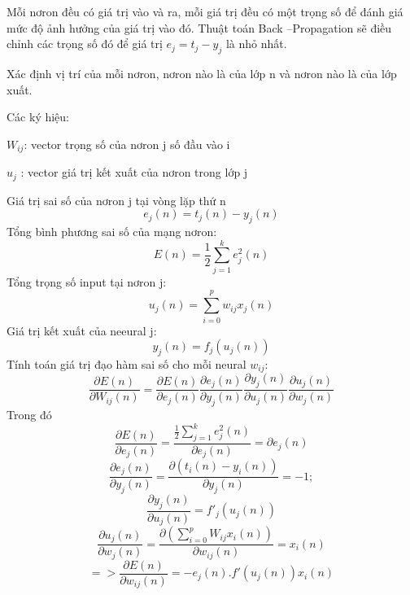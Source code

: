 Mỗi nơron đều có giá trị vào và ra, mỗi giá trị đều có một trọng số để đánh giá mức độ ảnh hưởng của giá trị vào đó. Thuật toán Back –Propagation sẽ điều chỉnh các trọng số đó để giá trị $ e_j = t_j - y_j $ là nhỏ nhất.

Xác định vị trí của mỗi nơron, nơron nào là của lớp n và nơron nào là của lớp xuất.

Các ký hiệu:

\qquad $W_{ij} $: vector trọng số của nơron j số đầu vào i

\qquad $u_j$ : vector giá trị kết xuất của nơron trong lớp j

Giá trị sai số của nơron j tại vòng lặp thứ n\\
\begin{equation}
e_j(n) = t_j(n) - y_j(n)
\end{equation}
Tổng bình phương sai số của mạng nơron:\\
\begin{equation}
E(n) = \frac{1}{2}\sum_{j= 1}^k e_j^2 (n)
\end{equation}
Tổng trọng số input tại nơron j:\\
\begin{equation}
u_j(n) = \sum_{i = 0}^pw_{ij}x_j(n)
\end{equation}
Giá trị kết xuất của neeural j:\\
\begin{equation}
y_j(n) = f_j(u_j(n))
\end{equation}
Tính toán giá trị đạo hàm sai số cho mỗi neural $w_{ij}$:
\begin{equation}
\frac{\partial E(n)}{\partial W_{ij}(n)} = \frac{\partial E(n)}{\partial e_j(n)}\frac{\partial e_j(n)}{\partial y_j(n)}\frac{\partial y_j(n)}{\partial u_j(n)}\frac{\partial u_j(n)}{\partial w_j(n)}
\end{equation}
Trong đó 
\begin{equation} 
\frac{\partial E(n)}{\partial e_j(n)}=\frac{\frac{1}{2} \sum_{j=1}^k e_j^2(n) }{\partial e_j(n)} = \partial e_j(n)
\end{equation}
\begin{equation} 
\frac{\partial e_j(n)}{\partial y_j(n)}=\frac{\partial(t_i(n) - y_i(n))}{\partial y_j(n)} = -1;
\end{equation}
\begin{equation} 
\frac{\partial y_j(n)}{\partial u_j(n)}=f'_j(u_j(n))
\end{equation}
\begin{equation} 
\frac{\partial u_j(n)}{\partial w_j(n)}=\frac{\partial (\sum_{i = 0}^p W_{ij} x_i(n))}{\partial w_{ij}(n)}= x_i(n)
\end{equation}
\begin{equation} 
=>\frac{\partial E(n)}{\partial w_{ij}(n)} = -e_j(n).f'(u_j(n))x_i(n)
\end{equation}

